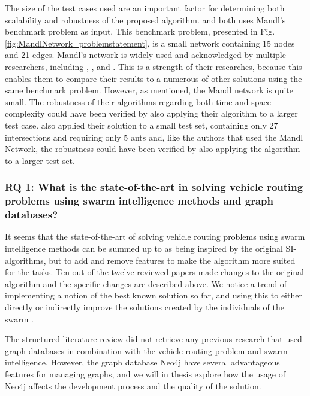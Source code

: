 The size of the test cases used are an important factor for determining both scalability and robustness of the proposed algorithm. \citet{nikolic14} and \citet{kechagiopoulos14} both uses Mandl's benchmark problem as input. This benchmark problem, presented in Fig. \vref{fig:MandlNetwork_problemstatement},  is a small network containing 15 nodes and 21 edges.  Mandl's network is widely used and acknowledged by multiple researchers, including \citet{baaj91}, \citet{chakroborty02}, and \citet{fan09}. This is a strength of their researches, because this enables them to compare their results to a numerous of other solutions using the same benchmark problem. However, as mentioned, the Mandl network is quite small. The robustness of their algorithms regarding both time and space complexity could have been verified by also applying their algorithm to a larger test case. \citet{salehi-nezhad07} also applied their solution to a small test set, containing only 27 intersections and requiring only 5 ants and, like the authors that used the Mandl Network, the robustness could have been verified by also applying the algorithm to a larger test set.  \newline

\subsubsection*{RQ 1: What is the state-of-the-art in solving vehicle routing problems using swarm intelligence methods and graph databases?}

It seems that the state-of-the-art of solving vehicle routing problems using swarm intelligence methods can be summed up to as being inspired by the original SI-algorithms, but to add and remove features to make the algorithm more suited for the tasks. Ten out of the twelve reviewed papers made changes to the original algorithm and the specific changes are described above. We notice a trend of implementing a notion of the best known solution so far, and using this to either directly or indirectly improve the solutions created by the individuals of the swarm \citep{tripathi09,sedighpour14,nikolic14}. 

The structured literature review did not retrieve any previous research that used graph databases in combination with the vehicle routing problem and swarm intelligence. However, the graph database Neo4j\citep{website:neo4j} have several advantageous features for managing graphs, and we will in thesis explore how the usage of Neo4j affects the development process and the quality of the solution.


